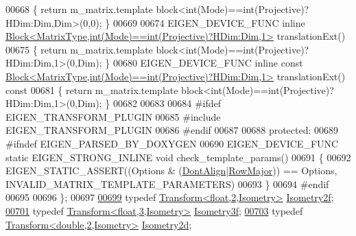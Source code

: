 \begin{DoxyCode}
00668 \textcolor{keyword}{  }\{ \textcolor{keywordflow}{return} m\_matrix.template block<int(Mode)==int(Projective)?HDim:Dim,Dim>(0,0); \}
00669 
00674   EIGEN\_DEVICE\_FUNC \textcolor{keyword}{inline} 
      \hyperlink{group___core___module_class_eigen_1_1_block}{Block<MatrixType,int(Mode)==int(Projective)?HDim:Dim,1>}
       translationExt()
00675   \{ \textcolor{keywordflow}{return} m\_matrix.template block<int(Mode)==int(Projective)?HDim:Dim,1>(0,Dim); \}
00680   EIGEN\_DEVICE\_FUNC \textcolor{keyword}{inline} \textcolor{keyword}{const} 
      \hyperlink{group___core___module_class_eigen_1_1_block}{Block<MatrixType,int(Mode)==int(Projective)?HDim:Dim,1>}
       translationExt()\textcolor{keyword}{ const}
00681 \textcolor{keyword}{  }\{ \textcolor{keywordflow}{return} m\_matrix.template block<int(Mode)==int(Projective)?HDim:Dim,1>(0,Dim); \}
00682 
00683 
00684 \textcolor{preprocessor}{  #ifdef EIGEN\_TRANSFORM\_PLUGIN}
00685 \textcolor{preprocessor}{  #include EIGEN\_TRANSFORM\_PLUGIN}
00686 \textcolor{preprocessor}{  #endif}
00687   
00688 \textcolor{keyword}{protected}:
00689 \textcolor{preprocessor}{  #ifndef EIGEN\_PARSED\_BY\_DOXYGEN}
00690     EIGEN\_DEVICE\_FUNC \textcolor{keyword}{static} EIGEN\_STRONG\_INLINE \textcolor{keywordtype}{void} check\_template\_params()
00691     \{
00692       EIGEN\_STATIC\_ASSERT((Options & (\hyperlink{group__enums_ggaacded1a18ae58b0f554751f6cdf9eb13a40a452614141522dd313363dbbd65726}{DontAlign}|\hyperlink{group__enums_ggaacded1a18ae58b0f554751f6cdf9eb13acfcde9cd8677c5f7caf6bd603666aae3}{RowMajor})) == Options, 
      INVALID\_MATRIX\_TEMPLATE\_PARAMETERS)
00693     \}
00694 \textcolor{preprocessor}{  #endif}
00695 
00696 \};
00697 
\hyperlink{group___geometry___module_gac031bf50068e71eac1a95b338301fc76}{00699} \textcolor{keyword}{typedef} \hyperlink{group___geometry___module_class_eigen_1_1_transform}{Transform<float,2,Isometry>} \hyperlink{group___geometry___module_gac031bf50068e71eac1a95b338301fc76}{Isometry2f};
\hyperlink{group___geometry___module_gaf32fcbd332028977266895dfd6a0a966}{00701} \textcolor{keyword}{typedef} \hyperlink{group___geometry___module_class_eigen_1_1_transform}{Transform<float,3,Isometry>} \hyperlink{group___geometry___module_gaf32fcbd332028977266895dfd6a0a966}{Isometry3f};
\hyperlink{group___geometry___module_ga85469b5fd842b7add09a12ebd5f6e5f7}{00703} \textcolor{keyword}{typedef} \hyperlink{group___geometry___module_class_eigen_1_1_transform}{Transform<double,2,Isometry>} \hyperlink{group___geometry___module_ga85469b5fd842b7add09a12ebd5f6e5f7}{Isometry2d};

\end{DoxyCode}
